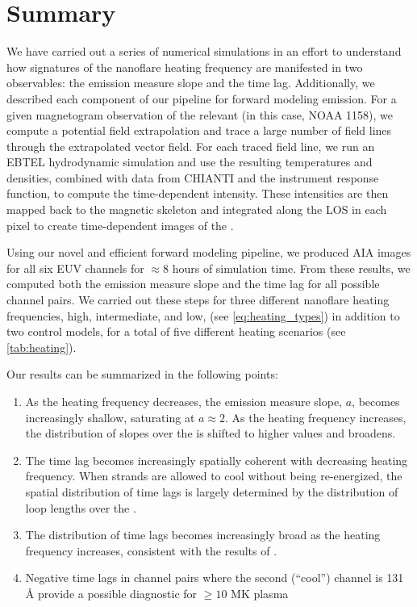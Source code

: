 
\section{Summary}\label{conclusions}

We have carried out a series of numerical simulations in an effort to understand how signatures of the nanoflare heating frequency are manifested in two observables: the emission measure slope and the time lag. Additionally, we described each component of our pipeline for forward modeling \AR{} emission. For a given magnetogram observation of the relevant \AR{} (in this case, NOAA 1158), we compute a potential field extrapolation and trace a large number of field lines through the extrapolated vector field. For each traced field line, we run an EBTEL hydrodynamic simulation and use the resulting temperatures and densities, combined with data from CHIANTI and the instrument response function, to compute the time-dependent intensity. These intensities are then mapped back to the magnetic skeleton and integrated along the LOS in each pixel to create time-dependent images of the \AR{}.

Using our novel and efficient forward modeling pipeline, we produced AIA images for all six EUV channels for $\approx8$ hours of simulation time. From these results, we computed both the emission measure slope and the time lag for all possible channel pairs. We carried out these steps for three different nanoflare heating frequencies, high, intermediate, and low, (see \autoref{eq:heating_types}) in addition to two control models, for a total of five different heating scenarios (see \autoref{tab:heating}).

Our results can be summarized in the following points:
\begin{enumerate}
    \item As the heating frequency decreases, the emission measure slope, $a$, becomes increasingly shallow, saturating at $a\approx2$. As the heating frequency increases, the distribution of slopes over the \AR{} is shifted to higher values and broadens.
    \item The time lag becomes increasingly spatially coherent with decreasing heating frequency. When strands are allowed to cool without being re-energized, the spatial distribution of time lags is largely determined by the distribution of loop lengths over the \AR{}.
    \item The distribution of time lags becomes increasingly broad  as the heating frequency increases, consistent with the results of \citet{viall_signatures_2016}.
    \item Negative time lags in channel pairs where the second (``cool'') channel is 131 \AA{} provide a possible diagnostic for $\ge10$ MK plasma
\end{enumerate}

